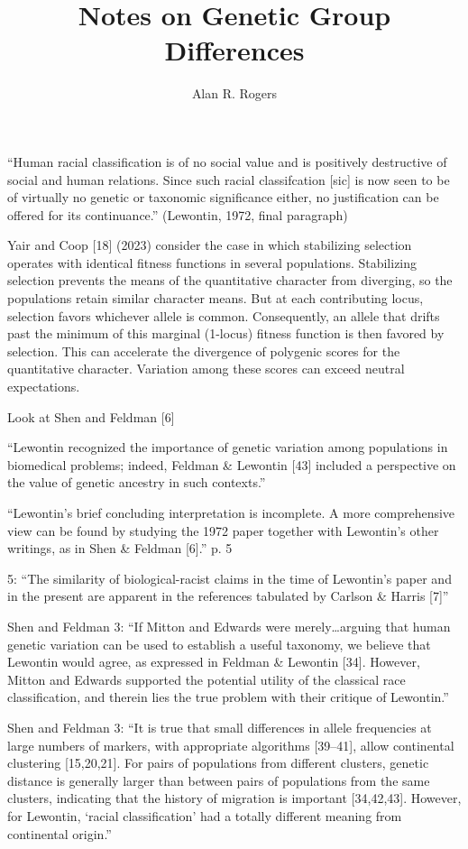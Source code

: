 \documentclass[11pt]{article}
\begin{document}
\title{Notes on Genetic Group Differences}
\author{Alan R. Rogers}
\maketitle

``Human racial classification is of no social value and is positively
destructive of social and human relations. Since such racial
classifcation [sic] is now seen to be of virtually no genetic or
taxonomic significance either, no justification can be offered for its
continuance.'' (Lewontin, 1972, final paragraph)

Yair and Coop [18] (2023) consider the case in which stabilizing
selection operates with identical fitness functions in several
populations. Stabilizing selection prevents the means of the
quantitative character from diverging, so the populations retain
similar character means. But at each contributing locus, selection
favors whichever allele is common. Consequently, an allele that drifts
past the minimum of this marginal (1-locus) fitness function is then
favored by selection. This can accelerate the divergence of polygenic
scores for the quantitative character. Variation among these scores
can exceed neutral expectations.

Look at Shen and Feldman [6]

``Lewontin recognized the importance of genetic variation among
populations in biomedical problems; indeed, Feldman \& Lewontin [43]
included a perspective on the value of genetic ancestry in such
contexts.''

``Lewontin’s brief concluding interpretation is incomplete. A more
comprehensive view can be found by studying the 1972 paper together
with Lewontin’s other writings, as in Shen \& Feldman [6].'' p. 5

5: ``The similarity of biological-racist claims in the time of
Lewontin’s paper and in the present are apparent in the references
tabulated by Carlson \& Harris [7]''

Shen and Feldman 3: ``If Mitton and Edwards were merely\ldots arguing
that human genetic variation can be used to establish a useful
taxonomy, we believe that Lewontin would agree, as expressed in
Feldman \& Lewontin [34]. However, Mitton and Edwards supported the
potential utility of the classical race classification, and therein
lies the true problem with their critique of Lewontin.''

Shen and Feldman 3: ``It is true that small differences in allele
frequencies at large numbers of markers, with appropriate algorithms
[39–41], allow continental clustering [15,20,21]. For pairs of
populations from different clusters, genetic distance is generally
larger than between pairs of populations from the same clusters,
indicating that the history of migration is important
[34,42,43]. However, for Lewontin, ‘racial classification’ had a
totally different meaning from continental origin.''
\end{document}
